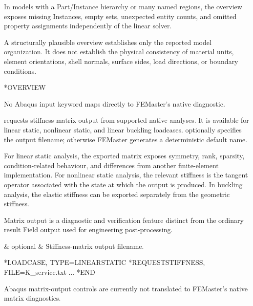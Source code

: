 In models with a Part/Instance hierarchy or many named regions, the overview exposes missing Instances, empty sets, unexpected entity counts, and omitted property assignments independently of the linear solver.

A structurally plausible overview establishes only the reported model organization. It does not establish the physical consistency of material units, element orientations, shell normals, surface sides, load directions, or boundary conditions.

\exampleheading
\begin{dialectexamples}
\begin{femasterdeck}
*OVERVIEW
\end{femasterdeck}
\begin{noabaqus}
No Abaqus input keyword maps directly to FEMaster's native  diagnostic.
\end{noabaqus}
\end{dialectexamples}


 requests stiffness-matrix output from supported native analyses. It is available for linear static, nonlinear static, and linear buckling loadcases.  optionally specifies the output filename; otherwise FEMaster generates a deterministic default name.

For linear static analysis, the exported matrix exposes symmetry, rank, sparsity, condition-related behaviour, and differences from another finite-element implementation. For nonlinear static analysis, the relevant stiffness is the tangent operator associated with the state at which the output is produced. In buckling analysis, the elastic stiffness can be exported separately from the geometric stiffness.

Matrix output is a diagnostic and verification feature distinct from the ordinary result Field output used for engineering post-processing.

\begin{keywordparameters}
 & optional & Stiffness-matrix output filename. \\
\end{keywordparameters}

\exampleheading
\begin{dialectexamples}
\begin{femasterdeck}
*LOADCASE, TYPE=LINEARSTATIC
*REQUESTSTIFFNESS, FILE=K_service.txt
...
*END
\end{femasterdeck}
\begin{noabaqus}
Abaqus matrix-output controls are currently not translated to FEMaster's native matrix diagnostics.
\end{noabaqus}
\end{dialectexamples}

